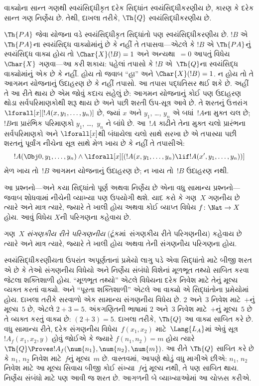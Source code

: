 \begin{ex}
વાક્યોના સાન્ત ગણથી સ્વયંસિદ્ધીકૃત
દરેક સિદ્ધાંત સ્વયંસિદ્ધીકરણીય છે, કારણ કે
દરેક સાન્ત ગણ નિર્ણેય છે. તેથી,
દાખલા તરીકે, $\Th{Q}$ સ્વયંસિદ્ધીકરણીય છે.

$\Th{PA}$ જેવા યોજના વડે સ્વયંસિદ્ધીકૃત
સિદ્ધાંતો પણ સ્વયંસિદ્ધીકરણીય છે. $!B$ એ
$\Th{PA}$ના સ્વયંસિદ્ધ વાક્યોમાંનું છે કે
નહીં તે તપાસવા—એટલે કે $!B$ એ
$\Th{PA}$નું સ્વયંસિદ્ધ વાક્ય હોય તો
$\Char{X}(!B)=1$ અને અન્યથા~$=0$
આપતું વિધેય~$\Char{X}$ ગણવા—આ કરી શકાય:
પહેલાં તપાસો કે $!B$ એ~$\Th{Q}$ના
સ્વયંસિદ્ધ વાક્યોમાંનું એક છે કે નહીં.
હોય તો જવાબ ``હા'' અને
$\Char{X}(!B)=1$. ન હોય તો તે આગમન
યોજનાનું ઉદાહરણ છે કે નહીં તપાસો. આ
તપાસ પદ્ધતિસર થઈ શકે છે. અહીં તે આ રીતે
થાય છે એમ જોવું કદાચ સહેલું છે: આગમન
યોજનાનું કોઈ પણ ઉદાહરણ થોડા સર્વપરિમાણકોથી
શરૂ થાય છે અને પછી શરતી ઉપ-સૂત્ર
આવે છે. તે શરતનું ઉત્તરાંગ
$\lforall[x][!A(x, y_1, \dots, y_n)]$
છે, જ્યાં $x$ અને $y_1$, \dots, $y_n$
એ બધાં~$!A$ના મુક્ત ચલ છે; $!B$ના
પ્રારંભિક પરિમાણકો $y_1$, \dots,~$y_n$
ને બાંધે છે. આ~$!A$ કાઢીને તેના મુક્ત
ચલો પ્રારંભના સર્વપરિમાણકો અને
$\lforall[x]$થી બંધાયેલા ચલો સાથે સરખા
છે એ તપાસ્યા પછી શરતનું પૂર્વાંગ
નીચેના સૂત્ર સાથે મેળ ખાય છે કે નહીં
તે તપાસીએ:
\[
!A(\Obj 0, y_1, \dots, y_n) \land \lforall[x][(!A(x, y_1, \dots, y_n)
\lif !A(x', y_1, \dots, y_n))]
\]
મેળ ખાય તો~$!B$ આગમન યોજનાનું
ઉદાહરણ છે; ન ખાય તો~$!B$ ઉદાહરણ નથી.
\end{ex}

આ પ્રશ્નનો—અને કયા સિદ્ધાંતો પૂર્ણ અથવા
નિર્ણેય છે એના વધુ સામાન્ય પ્રશ્નનો—જવાબ
શોધવામાં નીચેની વ્યાખ્યા પણ ઉપયોગી થશે.
યાદ કરો કે ગણ~$X$ ગણનીય છે ત્યારે
અને માત્ર ત્યારે, જ્યારે તે ખાલી હોય અથવા
કોઈ વ્યાપ્ત વિધેય
$f \colon \Nat \to X$ હોય. આવું વિધેય
$X$ની પરિગણના કહેવાય છે.

\begin{defn}
ગણ~$X$ \emph{સંગણકીય રીતે પરિગણનીય}
(ટૂંકમાં~સંગણકીય રીતે પરિગણનીય) કહેવાય છે ત્યારે અને માત્ર
ત્યારે, જ્યારે તે ખાલી હોય અથવા તેની
સંગણનીય પરિગણના હોય.
\end{defn}

સ્વયંસિદ્ધીકરણીયતા ઉપરાંત અપૂર્ણતાનાં
પ્રમેયો લાગુ પડે એવા સિદ્ધાંતો માટે બીજી શરત
એ છે કે તેઓ સંગણનીય વિધેયો અને
નિર્ણેય સંબંધો વિશેનાં મૂળભૂત તથ્યો
સાબિત કરવા જેટલા શક્તિશાળી હોય. ``મૂળભૂત
તથ્યો'' એટલે વિધેયના દરેક નિવેશ માટે તેનું
મૂલ્ય વ્યક્ત કરતાં વાક્યો. અને
``પૂરતા શક્તિશાળી'' એટલે આ વાક્યો એ
સિદ્ધાંતોના પ્રમેયોમાં હોય. દાખલા તરીકે
સરવાળો એક સામાન્ય સંગણનીય વિધેય છે.
$2$ અને~$3$ નિવેશ માટે~$+$નું મૂલ્ય~$5$
છે, એટલે $2+3=5$. અંકગણિતની ભાષામાં
$2$ અને~$3$ નિવેશ માટે~$+$નું મૂલ્ય~$5$
છે તે વ્યક્ત કરતું વાક્ય છે:
$(\num{2} + \num{3}) = \num{5}$.
દાખલા તરીકે, $\Th{Q}$ આ વાક્ય સાબિત
કરે છે. વધુ સામાન્ય રીતે, દરેક સંગણનીય
વિધેય~$f(x_1, x_2)$ માટે~$\Lang{L_A}$માં
એવું સૂત્ર~$!A_f(x_1, x_2, y)$
હોવું જોઈએ કે જ્યારે $f(n_1, n_2)=m$
હોય ત્યારે $\Th{Q} \Proves
!A_f(\num{n_1}, \num{n_2}, \num{m})$.
આ રીતે $\Th{Q}$ સાબિત કરે છે કે
$n_1$, $n_2$ નિવેશ માટે~$f$નું મૂલ્ય~$m$
છે. વાસ્તવમાં, આપણે થોડું વધુ માગીએ છીએ:
$n_1$, $n_2$ નિવેશ માટે આ મૂલ્ય સિવાય
બીજી કોઈ સંખ્યા~$f$નું મૂલ્ય નથી, તે પણ
સાબિત થાય.
નિર્ણેય સંબંધો માટે પણ આવી જ શરત
છે. આગળની બે વ્યાખ્યાઓમાં આ ચોક્કસ કરીએ.


